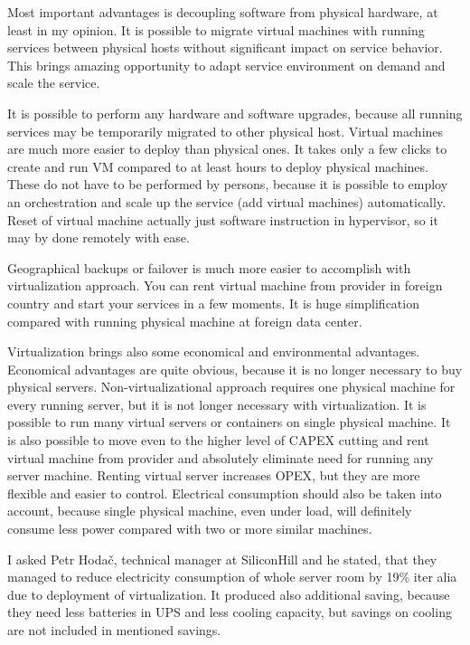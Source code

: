 
Most important advantages is decoupling software from physical hardware, at least in my opinion. It is possible to migrate virtual machines with running services between physical hosts without significant impact on service behavior. This brings amazing opportunity to adapt service environment on demand and scale the service.

It is possible to perform any hardware and software upgrades, because all running services may be temporarily migrated to other physical host. Virtual machines are much more easier to deploy than physical ones. It takes only a few clicks to create and run \Ac{VM} compared to at least hours to deploy physical machines. These  do not have to be performed by persons, because it is possible to employ an orchestration and scale up the service (add virtual machines) automatically.
Reset of virtual machine actually just software instruction in hypervisor, so it may by done remotely with ease.

Geographical backups or failover is much more easier to accomplish with virtualization approach. You can rent virtual machine from provider in foreign country and start your services in a few moments. It is huge simplification compared with running physical machine at foreign data center.

Virtualization brings also some economical and environmental advantages. Economical advantages are quite obvious, because it is no longer necessary to buy physical servers. Non-virtualizational approach requires one physical machine for every running server, but it is not longer necessary with virtualization. It is possible to run many virtual servers or containers on single physical machine. It is also possible to move even to the higher level of \Ac{CAPEX} cutting and rent virtual machine from provider and absolutely eliminate need for running any server machine. Renting virtual server increases \Ac{OPEX}, but they are more flexible and easier to control.
Electrical consumption should also be taken into account, because single physical machine, even under load, will definitely consume less power compared with two or more similar machines. 

I asked Petr Hodač, technical manager at SiliconHill and he stated, that they managed to reduce electricity consumption of whole server room by 19\% iter alia due to deployment of virtualization. It produced also additional saving, because they need less batteries in \Ac{UPS} and less cooling capacity, but savings on cooling are not included in mentioned savings.

